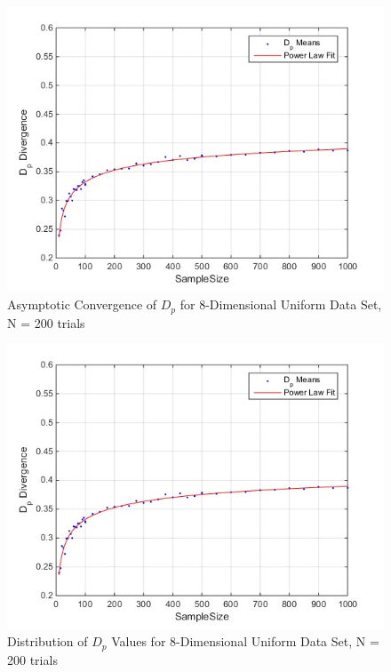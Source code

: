 \documentclass{article}
\begin{document}
	\begin{figure}[h!]
		\caption{Asymptotic Convergence of $D_p$ for 8-Dimensional Uniform Data Set, N = 200 trials}
		\centering
		\includegraphics[scale=0.6]{dp_n200_uniform}
	\end{figure}	
	
	\begin{figure}[h!]
		\caption{Distribution of $D_p$ Values for 8-Dimensional Uniform Data Set, N = 200 trials}
		\centering
		\includegraphics[scale=0.6]{dp_n200_uniform}
	\end{figure}	
\end{document}
